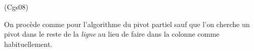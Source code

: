 \begin{tiny}(Cgs08)\end{tiny} On procède comme pour l'algorithme du pivot partiel sauf que l'on cherche un pivot dans le reste de la \emph{ligne} au lieu de faire dans la colonne comme habituellement.